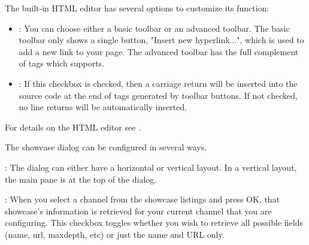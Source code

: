 
The built-in HTML editor has several options to customize its function:

\begin{itemize}
  \item {}: You can choose either a basic 
  toolbar or an advanced toolbar. The basic toolbar only shows a single 
  button, "Insert new  hyperlink...", which is used to add a new link to 
  your page. The advanced toolbar has the full complement of tags which 
  \brandingapplicationsuitename supports.

  \item {}: If this checkbox is checked, then a carriage return will be 
  inserted into the source code at the end of tags generated by toolbar 
  buttons. If not checked, no line returns will be automatically inserted.
\end{itemize}

For details on the HTML editor see
  \helpignore{\ref{sec:pd-editor-dialog}}
  .


The showcase dialog can be configured in several ways.

: The dialog can either have a horizontal or 
vertical layout. In a vertical layout, the main pane is at the top of the 
dialog.

: When you select a channel from 
the showcase listings and press OK, that showcase's information is retrieved 
for your current channel that you are configuring. This checkbox toggles 
whether you wish to retrieve all possible fields (name, url, maxdepth, etc) or 
just the name and URL only.

